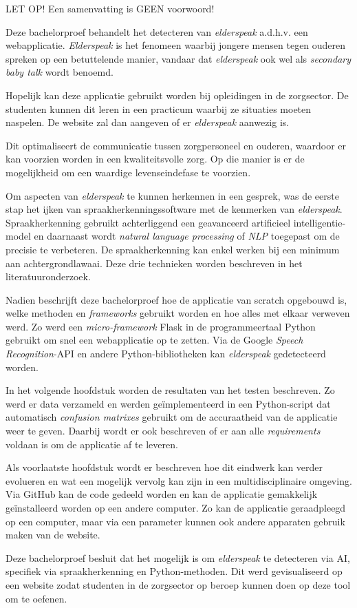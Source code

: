 LET OP! Een samenvatting is GEEN voorwoord!

\color{black}
Deze bachelorproef behandelt het detecteren van \textit{elderspeak} a.d.h.v. een webapplicatie. \textit{Elderspeak} is het fenomeen waarbij jongere mensen tegen ouderen spreken op een betuttelende manier,  vandaar dat \textit{elderspeak} ook wel als \textit{secondary baby talk} wordt benoemd.

Hopelijk kan deze applicatie gebruikt worden bij opleidingen in de zorgsector. De studenten kunnen dit leren in een practicum waarbij ze situaties moeten naspelen. De website zal dan aangeven of er \textit{elderspeak} aanwezig is.

Dit optimaliseert de communicatie tussen zorgpersoneel en ouderen, waardoor er kan voorzien worden in een kwaliteitsvolle zorg. Op die manier is er de mogelijkheid om een waardige levenseindefase te voorzien.

Om aspecten van \textit{elderspeak} te kunnen herkennen in een gesprek, was de eerste stap het ijken van spraakherkenningssoftware met de kenmerken van \textit{elderspeak}. Spraakherkenning gebruikt achterliggend een geavanceerd artificieel intelligentie-model en daarnaast wordt \textit{natural language processing} of \textit{NLP} toegepast om de precisie te verbeteren. De spraakherkenning kan enkel werken bij een minimum aan achtergrondlawaai. Deze drie technieken worden beschreven in het literatuuronderzoek.

Nadien beschrijft deze bachelorproef hoe de applicatie van scratch opgebouwd is, welke methoden en \textit{frameworks} gebruikt worden en hoe alles met elkaar verweven werd. Zo werd een \textit{micro-framework} Flask in de programmeertaal Python gebruikt om snel een webapplicatie op te zetten. Via de Google \textit{Speech Recognition}-API en andere Python-bibliotheken kan \textit{elderspeak} gedetecteerd worden.

In het volgende hoofdstuk worden de resultaten van het testen beschreven. Zo werd er data verzameld en werden geïmplementeerd in een Python-script dat automatisch \textit{confusion matrixes} gebruikt om de accuraatheid van de applicatie weer te geven. Daarbij wordt er ook beschreven of er aan alle \textit{requirements} voldaan is om de applicatie af te leveren.

Als voorlaatste hoofdstuk wordt er beschreven hoe dit eindwerk kan verder evolueren en wat een mogelijk vervolg kan zijn in een multidisciplinaire omgeving. Via GitHub kan de code gedeeld worden en kan de applicatie gemakkelijk geïnstalleerd worden op een andere computer. Zo kan de applicatie geraadpleegd op een computer, maar via een parameter kunnen ook andere apparaten gebruik maken van de website.

Deze bachelorproef besluit dat het mogelijk is om \textit{elderspeak} te detecteren via AI, specifiek via spraakherkenning en Python-methoden. Dit werd gevisualiseerd op een website zodat studenten in de zorgsector op beroep kunnen doen op deze tool om te oefenen.

